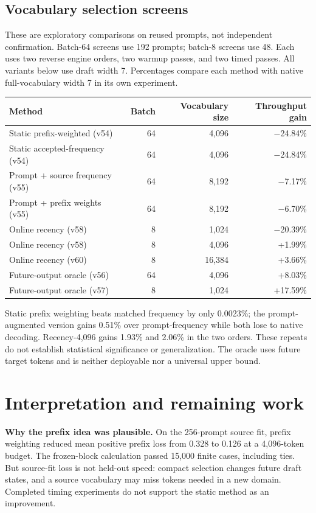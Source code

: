\documentclass[10pt]{article}
\begin{document}
\subsection{Vocabulary selection screens}
These are exploratory comparisons on reused prompts, not independent confirmation. Batch-64 screens use 192 prompts; batch-8 screens use 48. Each uses two reverse engine orders, two warmup passes, and two timed passes. All variants below use draft width 7. Percentages compare each method with native full-vocabulary width 7 in its own experiment.
\begin{center}
\begin{tabular}{@{}lrrr@{}}
\toprule
Method & Batch & Vocabulary size & Throughput gain \\
\midrule
Static prefix-weighted (v54) & 64 & 4,096 & $-$24.84\% \\
Static accepted-frequency (v54) & 64 & 4,096 & $-$24.84\% \\
Prompt + source frequency (v55) & 64 & 8,192 & $-$7.17\% \\
Prompt + prefix weights (v55) & 64 & 8,192 & $-$6.70\% \\
Online recency (v58) & 8 & 1,024 & $-$20.39\% \\
Online recency (v58) & 8 & 4,096 & +1.99\% \\
Online recency (v60) & 8 & 16,384 & +3.66\% \\
\midrule
Future-output oracle (v56) & 64 & 4,096 & +8.03\% \\
Future-output oracle (v57) & 8 & 1,024 & +17.59\% \\
\bottomrule
\end{tabular}
\end{center}
Static prefix weighting beats matched frequency by only 0.0023\%; the prompt-augmented version gains 0.51\% over prompt-frequency while both lose to native decoding. Recency-4,096 gains 1.93\% and 2.06\% in the two orders. These repeats do not establish statistical significance or generalization. The oracle uses future target tokens and is neither deployable nor a universal upper bound.
\newpage
\section{Interpretation and remaining work}
\textbf{Why the prefix idea was plausible.} On the 256-prompt source fit, prefix weighting reduced mean positive prefix loss from 0.328 to 0.126 at a 4,096-token budget. The frozen-block calculation passed 15,000 finite cases, including ties. But source-fit loss is not held-out speed: compact selection changes future draft states, and a source vocabulary may miss tokens needed in a new domain. Completed timing experiments do not support the static method as an improvement.
\end{document}
